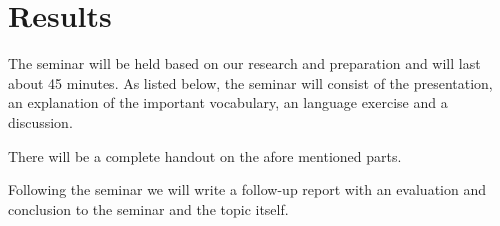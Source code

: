 \section*{Results}
The seminar will be held based on our research and preparation and will last about 45 minutes. As listed below, the seminar will consist of the presentation, an explanation of the important vocabulary, an language exercise and a discussion.

There will be a complete handout on the afore mentioned parts.

Following the seminar we will write a follow-up report with an evaluation and conclusion to the seminar and the topic itself.
